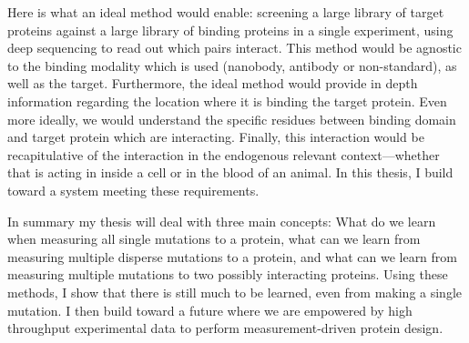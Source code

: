 Here is what an ideal method would enable: screening a large library of target proteins against a large library of binding proteins in a single experiment, using deep sequencing to read out which pairs interact. This method would be agnostic to the binding modality which is used (nanobody, antibody or non-standard), as well as the target. Furthermore, the ideal method would provide in depth information regarding the location where it is binding the target protein. Even more ideally, we would understand the specific residues between binding domain and target protein which are interacting. Finally, this interaction would be recapitulative of the interaction in the endogenous relevant context---whether that is acting in inside a cell or in the blood of an animal. In this thesis, I build toward a system meeting these requirements. 

In summary my thesis will deal with three main concepts: What do we learn when measuring all single mutations to a protein, what can we learn from measuring multiple disperse mutations to a protein, and what can we learn from measuring multiple mutations to two possibly interacting proteins. Using these methods, I show that there is still much to be learned, even from making a single mutation. I then build toward a future where we are empowered by high throughput experimental data to perform measurement-driven protein design. 








